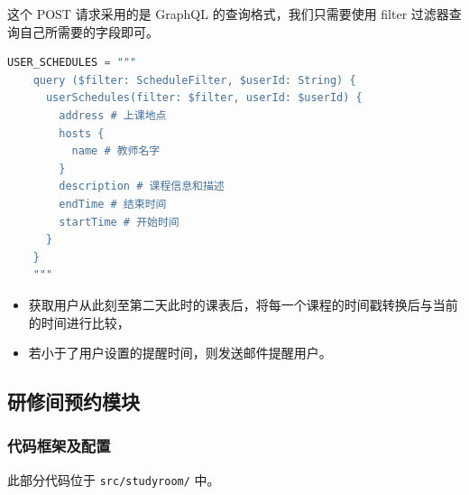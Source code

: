 \documentclass[14pt,a4paper,UTF8,twoside]{article}
\begin{document}
这个 POST 请求采用的是 GraphQL 的查询格式，我们只需要使用 filter 过滤器查询自己所需要的字段即可。

\begin{lstlisting}[language=python]
    USER_SCHEDULES = """
    query ($filter: ScheduleFilter, $userId: String) {
      userSchedules(filter: $filter, userId: $userId) {
        address # 上课地点
        hosts {
          name # 教师名字
        }
        description # 课程信息和描述
        endTime # 结束时间
        startTime # 开始时间
      }
    }
    """
\end{lstlisting}

\begin{itemize}
    \item 获取用户从此刻至第二天此时的课表后，将每一个课程的时间戳转换后与当前的时间进行比较，
    \item 若小于了用户设置的提醒时间，则发送邮件提醒用户。
\end{itemize}

\newpage{}

\subsection{研修间预约模块}

\subsubsection{代码框架及配置}

此部分代码位于 \texttt{src/studyroom/} 中。
\end{document}
